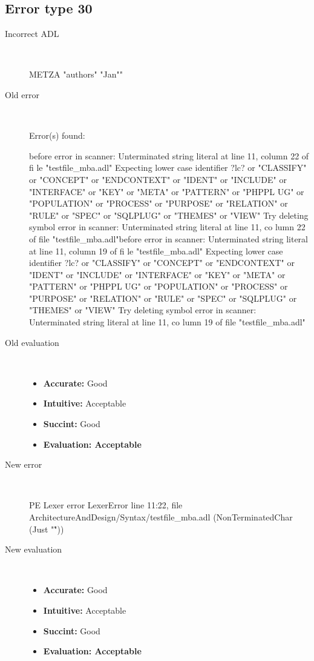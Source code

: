 \hrulefill

\subsection{Error type 30}
  \begin{description}
  \item[Incorrect ADL]~\\
\begin{adl}
METZA "authors"  "Jan""\end{adl}
  \item[Old error]~\\
\begin{haskell}
Error(s) found:

before error in scanner: Unterminated string literal at line 11, column 22 of fi
le "testfile_mba.adl"
Expecting lower case identifier ?lc? or "CLASSIFY" or "CONCEPT" or "ENDCONTEXT"
or "IDENT" or "INCLUDE" or "INTERFACE" or "KEY" or "META" or "PATTERN" or "PHPPL
UG" or "POPULATION" or "PROCESS" or "PURPOSE" or "RELATION" or "RULE" or "SPEC"
or "SQLPLUG" or "THEMES" or "VIEW"
Try deleting symbol error in scanner: Unterminated string literal at line 11, co
lumn 22 of file "testfile_mba.adl"before error in scanner: Unterminated string literal at line 11, column 19 of fi
le "testfile_mba.adl"
Expecting lower case identifier ?lc? or "CLASSIFY" or "CONCEPT" or "ENDCONTEXT"
or "IDENT" or "INCLUDE" or "INTERFACE" or "KEY" or "META" or "PATTERN" or "PHPPL
UG" or "POPULATION" or "PROCESS" or "PURPOSE" or "RELATION" or "RULE" or "SPEC"
or "SQLPLUG" or "THEMES" or "VIEW"
Try deleting symbol error in scanner: Unterminated string literal at line 11, co
lumn 19 of file "testfile_mba.adl"
\end{haskell}
  \item[Old evaluation]~\\
    \begin{itemize}
    \item \textbf{Accurate:} Good
    \item \textbf{Intuitive:} Acceptable
    \item \textbf{Succint:} Good
    \item \textbf{Evaluation: Acceptable}
    \end{itemize}
  \item[New error]~\\
\begin{haskell}
PE Lexer error LexerError line 11:22, file ArchitectureAndDesign/Syntax/testfile_mba.adl (NonTerminatedChar (Just "\r"))\end{haskell}
  \item[New evaluation]~\\
    \begin{itemize}
    \item \textbf{Accurate:} Good
    \item \textbf{Intuitive:} Acceptable
    \item \textbf{Succint:} Good
    \item \textbf{Evaluation: Acceptable
}
    \end{itemize}
  \end{description}

